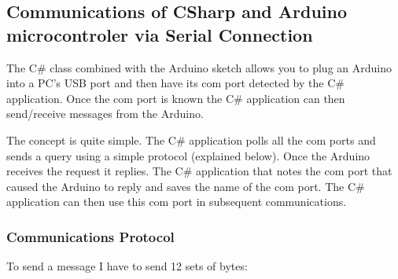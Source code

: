 \subsection{Communications of CSharp and Arduino microcontroler via Serial Connection}

The C\# class combined with the Arduino sketch allows you to plug an Arduino into a PC's USB port and then have its com port detected by the C\# application. Once the com port is known the C\# application can then send/receive messages from the Arduino.

The concept is quite simple. The C\# application polls all the com ports and sends a query using a simple protocol (explained below). Once the Arduino receives the request it replies. The C\# application that notes the com port that caused the Arduino to reply and saves the name of the com port. The C\# application can then use this com port in subsequent communications.

\subsubsection{Communications Protocol}

To send a message I have to send 12 sets of bytes:

